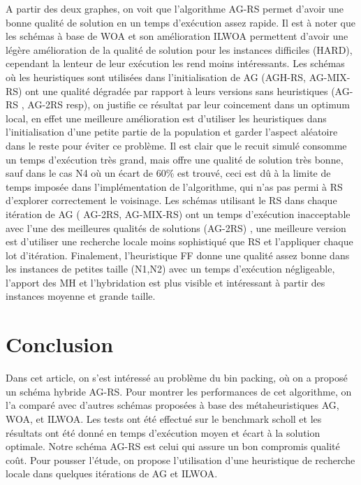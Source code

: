 \documentclass[preprint]{elsarticle}
\begin{document}
A partir des deux graphes, on voit que l’algorithme AG-RS permet d’avoir une bonne qualité de solution en un temps d’exécution assez rapide. Il est à noter que les schémas à base de WOA et son amélioration ILWOA permettent d’avoir une légère amélioration de la qualité de solution pour les instances difficiles (HARD), cependant la lenteur de leur exécution les rend moins intéressants.
 Les schémas où les heuristiques sont utilisées dans l’initialisation de AG (AGH-RS, AG-MIX-RS) ont une qualité dégradée par rapport à leurs versions sans heuristiques (AG-RS , AG-2RS resp),
  on justifie ce résultat par leur coincement dans un optimum local, en effet une meilleure amélioration est d’utiliser les heuristiques dans l’initialisation d’une petite partie de la population et garder l’aspect aléatoire dans le reste pour éviter ce problème. Il est clair que le recuit simulé consomme un temps d'exécution très grand, mais offre une qualité de solution très bonne,
   sauf dans le cas N4 où un écart de 60\% est trouvé, ceci est dû à la limite de temps imposée dans l'implémentation de l’algorithme, qui n’as pas permi à RS d’explorer correctement le voisinage. 
   Les schémas utilisant le RS dans chaque itération de AG ( AG-2RS, AG-MIX-RS) ont un temps d'exécution inacceptable avec l’une des meilleures qualités de solutions (AG-2RS) , une meilleure version est d'utiliser une recherche locale moins sophistiqué que RS et l’appliquer chaque lot d’itération.
    Finalement, l’heuristique FF donne une qualité assez bonne dans les instances de petites taille (N1,N2) avec un temps d'exécution négligeable, l’apport des MH et l’hybridation est plus visible et intéressant à partir des instances moyenne et grande taille. 

\section{Conclusion}
Dans cet article, on s’est intéressé au problème du bin packing, où on a proposé un schéma hybride AG-RS. Pour montrer les performances de cet algorithme, on l’a comparé avec d’autres schémas proposées à base des métaheuristiques AG, WOA, et ILWOA. Les tests ont été effectué sur le benchmark scholl et les résultats ont été donné en temps d'exécution moyen et écart à la solution optimale. Notre schéma AG-RS est celui qui assure un bon compromis qualité coût. Pour pousser l’étude, on propose l’utilisation d’une heuristique de recherche locale dans quelques itérations de AG et ILWOA. 
\medskip


\end{document}
